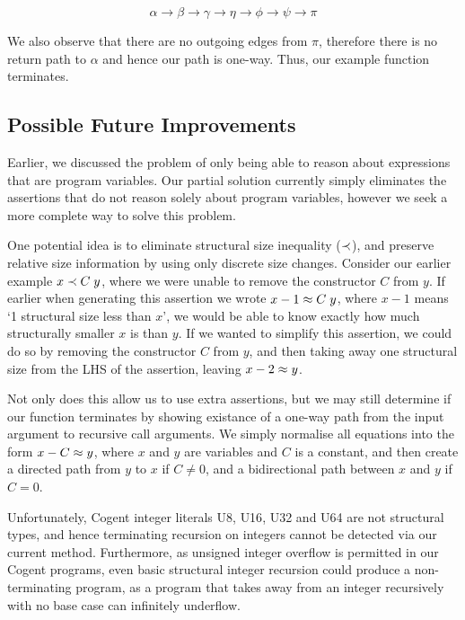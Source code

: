 \[
    \alpha \rightarrow \beta \rightarrow \gamma \rightarrow
    \eta   \rightarrow \phi  \rightarrow \psi   \rightarrow
    \pi
\]

We also observe that there are no outgoing edges from $\pi$, therefore there is no return path
to $\alpha$ and hence our path is one-way. Thus, our example function terminates.

\subsection{Possible Future Improvements}

Earlier, we discussed the problem of only being able to reason about expressions that are
program variables. Our partial solution currently simply eliminates the assertions that
do not reason solely about program variables, however we seek a more complete way to solve
this problem.

One potential idea is to eliminate structural size inequality ($\prec$), and preserve relative
size information by using only discrete size changes. Consider our earlier example $x \prec C\; y$,
where we were unable to remove the constructor $C$ from $y$. 
If earlier when generating this assertion we wrote  $x - 1 \approx C\; y$,
where $x - 1$ means `1 structural size less than $x$', we would be able to know exactly
how much structurally smaller $x$ is than $y$. If we wanted to simplify this assertion,
we could do so by removing the constructor $C$ from $y$, and then taking away one structural size from
the LHS of the assertion, leaving $x - 2 \approx y$.

Not only does this allow us to use extra assertions, but we may still determine 
if our function terminates by showing existance of a one-way path from the input
argument to recursive call arguments. We simply normalise all equations into the
form $x - C \approx y$, where $x$ and $y$ are variables and $C$ is a constant, and
then create a directed path from $y$ to $x$ if $C \neq 0$, and a bidirectional
path between $x$ and $y$ if $C = 0$.

Unfortunately, Cogent integer literals \textsc{U8}, \textsc{U16}, \textsc{U32} and
\textsf{U64} are not structural types, and hence terminating recursion on integers
cannot be detected via our current method. Furthermore, as unsigned integer
overflow is permitted in our Cogent programs, even basic structural integer
recursion could produce a non-terminating program, as a program that takes
away from an integer recursively with no base case can infinitely underflow.

